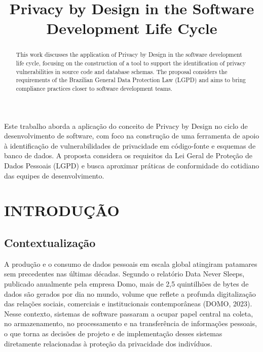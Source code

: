 \documentclass[oneside]{normas-utf-tex}
\title{Privacy by Design in the Software Development Life Cycle}
\begin{document}
\pdfstringdefDisableCommands{\let\MakeUppercase\relax}
\capa
\folhaderosto

\begin{resumo}
Este trabalho aborda a aplicação do conceito de Privacy by Design no ciclo de desenvolvimento de software, com foco na construção de uma ferramenta de apoio à identificação de vulnerabilidades de privacidade em código-fonte e esquemas de banco de dados. A proposta considera os requisitos da Lei Geral de Proteção de Dados Pessoais (LGPD) e busca aproximar práticas de conformidade do cotidiano das equipes de desenvolvimento.
\end{resumo}

\begin{abstract}
This work discusses the application of Privacy by Design in the software development life cycle, focusing on the construction of a tool to support the identification of privacy vulnerabilities in source code and database schemas. The proposal considers the requirements of the Brazilian General Data Protection Law (LGPD) and aims to bring compliance practices closer to software development teams.
\end{abstract}


\listadesiglas
\sumario

\chapter{INTRODUÇÃO}

\section{Contextualização}

A produção e o consumo de dados pessoais em escala global atingiram patamares sem precedentes nas últimas décadas. Segundo o relatório Data Never Sleeps, publicado anualmente pela empresa Domo, mais de 2,5 quintilhões de bytes de dados são gerados por dia no mundo, volume que reflete a profunda digitalização das relações sociais, comerciais e institucionais contemporâneas (DOMO, 2023). Nesse contexto, sistemas de software passaram a ocupar papel central na coleta, no armazenamento, no processamento e na transferência de informações pessoais, o que torna as decisões de projeto e de implementação desses sistemas diretamente relacionadas à proteção da privacidade dos indivíduos.
\end{document}
